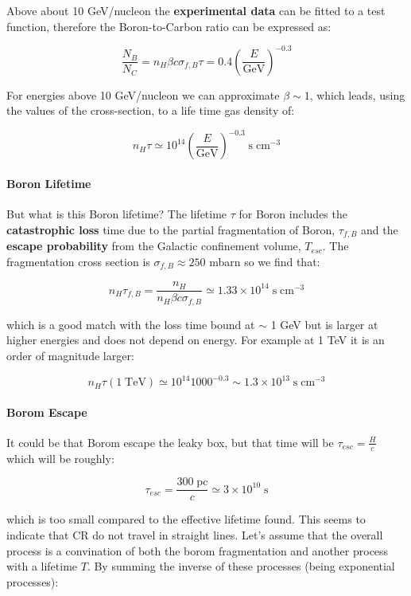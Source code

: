 \documentclass[
  letterpaper,
  DIV=11,
  numbers=noendperiod]{scrreprt}
\let\oldparagraph\paragraph
\renewcommand{\paragraph}[1]{\oldparagraph{#1}\mbox{}}
\begin{document}
Above about 10 GeV/nucleon the \textbf{experimental data} can be fitted
to a test function, therefore the Boron-to-Carbon ratio can be expressed
as:

\[\frac{N_B}{N_C} = n_{H}\beta c \sigma_{f,B} \tau  =0.4 \left(\frac{E}{\mathrm{GeV}}\right)^{-0.3}\]

For energies above 10 GeV/nucleon we can approximate \(\beta \sim 1\),
which leads, using the values of the cross-section, to a life time gas
density of:

\[n_H \tau \simeq 10^{14}\left(\frac{E}{\mathrm{GeV}}\right)^{-0.3} \; \mathrm{s}\;\mathrm{cm}^{-3}\]

\paragraph{Boron Lifetime}\label{boron-lifetime}

But what is this Boron lifetime? The lifetime \(\tau\) for Boron
includes the \textbf{catastrophic loss} time due to the partial
fragmentation of Boron, \(\tau_{f,B}\) and the \textbf{escape
probability} from the Galactic confinement volume, \(T_{esc}\). The
fragmentation cross section is \(\sigma_{f,B} \approx 250\) mbarn so we
find that:

\[n_H \tau_{f,B} = \frac{n_H}{n_H \beta c \sigma_{f,B}} \simeq 1.33 \times 10^{14}\; \mathrm{s}\;\mathrm{cm}^{-3}\]

which is a good match with the loss time bound at \(\sim\) 1 GeV but is
larger at higher energies and does not depend on energy. For example at
1 TeV it is an order of magnitude larger:

\[ n_H\tau(1\; \mathrm{TeV}) \simeq 10^{14} 1000^{-0.3} \sim 1.3 \times 10^{13} \mathrm{\;s\;cm}^{-3}\]

\paragraph{Borom Escape}\label{borom-escape}

It could be that Borom escape the leaky box, but that time will be
\(\tau_{esc} = \frac{H}{c}\) which will be roughly:

\[\tau_{esc} = \frac{300\;\mathrm{pc}}{c} \simeq 3\times 10^{10}\; \mathrm{s}\]

which is too small compared to the effective lifetime found. This seems
to indicate that CR do not travel in straight lines. Let's assume that
the overall process is a convination of both the borom fragmentation and
another process with a lifetime \(T\). By summing the inverse of these
processes (being exponential processes):
\end{document}
